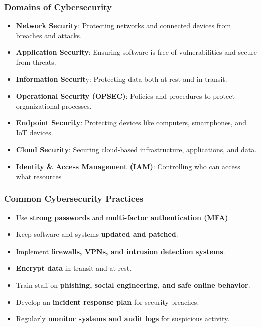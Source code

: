 \subsubsection{Domains of Cybersecurity}

\begin{itemize}
    \item \textbf{Network Security}: Protecting networks and connected devices from breaches and attacks.
    \item \textbf{Application Security}: Ensuring software is free of vulnerabilities and secure from threats.
    \item \textbf{Information Securit}y: Protecting data both at rest and in transit.
    \item \textbf{Operational Security (OPSEC)}: Policies and procedures to protect organizational processes.
    \item \textbf{Endpoint Security}: Protecting devices like computers, smartphones, and IoT devices.
    \item \textbf{Cloud Security}: Securing cloud-based infrastructure, applications, and data.
    \item \textbf{Identity \& Access Management (IAM)}: Controlling who can access what resources
\end{itemize}

\subsubsection{Common Cybersecurity Practices}

\begin{itemize}
    \item Use \textbf{strong passwords} and \textbf{multi-factor authentication (MFA)}.
    \item Keep software and systems \textbf{updated and patched}.
    \item Implement \textbf{firewalls, VPNs, and intrusion detection systems}.
    \item \textbf{Encrypt data} in transit and at rest.
    \item Train staff on \textbf{phishing, social engineering, and safe online behavior}.
    \item Develop an \textbf{incident response plan} for security breaches.
    \item Regularly \textbf{monitor systems and audit logs} for suspicious activity.
\end{itemize}

